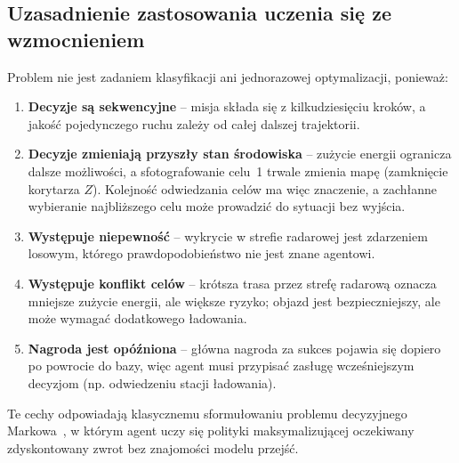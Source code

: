 \subsection{Uzasadnienie zastosowania uczenia się ze wzmocnieniem}
\label{sec:uzasadnienie}

Problem nie jest zadaniem klasyfikacji ani jednorazowej optymalizacji, ponieważ:

\begin{enumerate}
  \item \textbf{Decyzje są sekwencyjne} -- misja składa się z kilkudziesięciu
        kroków, a jakość pojedynczego ruchu zależy od całej dalszej trajektorii.
  \item \textbf{Decyzje zmieniają przyszły stan środowiska} -- zużycie energii
        ogranicza dalsze możliwości, a sfotografowanie celu~1 trwale zmienia
        mapę (zamknięcie korytarza $Z$). Kolejność odwiedzania celów ma więc
        znaczenie, a zachłanne wybieranie najbliższego celu może prowadzić
        do sytuacji bez wyjścia.
  \item \textbf{Występuje niepewność} -- wykrycie w strefie radarowej jest
        zdarzeniem losowym, którego prawdopodobieństwo nie jest znane agentowi.
  \item \textbf{Występuje konflikt celów} -- krótsza trasa przez strefę
        radarową oznacza mniejsze zużycie energii, ale większe ryzyko;
        objazd jest bezpieczniejszy, ale może wymagać dodatkowego ładowania.
  \item \textbf{Nagroda jest opóźniona} -- główna nagroda za sukces pojawia
        się dopiero po powrocie do bazy, więc agent musi przypisać zasługę
        wcześniejszym decyzjom (np. odwiedzeniu stacji ładowania).
\end{enumerate}

Te cechy odpowiadają klasycznemu sformułowaniu problemu decyzyjnego
Markowa~\cite{sutton2018}, w którym agent uczy się polityki maksymalizującej
oczekiwany zdyskontowany zwrot bez znajomości modelu przejść.
